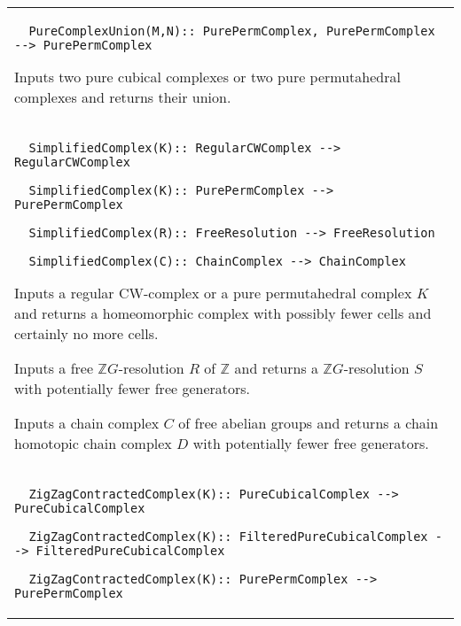 \documentclass[a4paper,11pt]{report}
\begin{document}
{\begin{center}
\begin{tabular}{|l|}
\begin{verbatim}  PureComplexUnion(M,N):: PurePermComplex, PurePermComplex --> PurePermComplex
\end{verbatim}


 

 Inputs two pure cubical complexes or two pure permutahedral complexes and
returns their union. \\
 \index{SimplifiedComplex} 
\begin{verbatim}  SimplifiedComplex(K):: RegularCWComplex --> RegularCWComplex
\end{verbatim}
 
\begin{verbatim}  SimplifiedComplex(K):: PurePermComplex --> PurePermComplex
\end{verbatim}
 
\begin{verbatim}  SimplifiedComplex(R):: FreeResolution --> FreeResolution
\end{verbatim}
 
\begin{verbatim}  SimplifiedComplex(C):: ChainComplex --> ChainComplex
\end{verbatim}


 

 Inputs a regular CW-complex or a pure permutahedral complex $K$ and returns a homeomorphic complex with possibly fewer cells and certainly no
more cells. 

 Inputs a free $\mathbb ZG$-resolution $R$ of $\mathbb Z$ and returns a $\mathbb ZG$-resolution $S$ with potentially fewer free generators. 

 Inputs a chain complex $C$ of free abelian groups and returns a chain homotopic chain complex $D$ with potentially fewer free generators. \\
 \index{ZigZagContractedComplex} 
\begin{verbatim}  ZigZagContractedComplex(K):: PureCubicalComplex --> PureCubicalComplex
\end{verbatim}
 
\begin{verbatim}  ZigZagContractedComplex(K):: FilteredPureCubicalComplex --> FilteredPureCubicalComplex
\end{verbatim}
 
\begin{verbatim}  ZigZagContractedComplex(K):: PurePermComplex --> PurePermComplex
\end{verbatim}
 


\end{tabular}
\end{center}}
\end{document}
